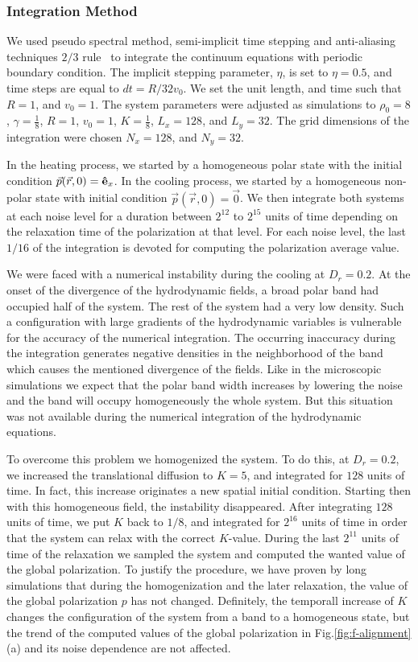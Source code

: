 \documentclass[reprint,floatfix,amsmath,amssymb,aps,pre,showkeys,showpacs,superscriptaddress]{revtex4-1}
\newcommand{\p}{p}
\begin{document}
\subsubsection{Integration Method}

We used pseudo spectral method, semi-implicit time stepping and anti-aliasing techniques $2/3$ rule~\cite{uecker2009short,canuto1993spectral} to integrate the continuum equations with periodic boundary condition. The implicit stepping parameter, $\eta$, is set to $\eta=0.5$, and time steps are equal to $dt=R/32v_0$. We set the unit length, and time such that $R=1$, and $v_0=1$. The system parameters were adjusted as simulations to $\rho_0=8$, $\gamma=\tfrac{1}{8}$, $R=1$, $v_0=1$, $K=\tfrac{1}{8}$, $L_x=128$, and $L_y=32$. The grid dimensions of the integration were chosen $N_x=128$, and $N_y=32$.

In the heating process, we started by a homogeneous polar state with the initial condition $\vec{p}(\vec{r},0) = {\bf \hat{e}}_x$. In the cooling process, we started by a homogeneous non-polar state with initial condition $\vec{p}(\vec{r},0) = \vec{0}$. We then integrate both systems at each noise level for a duration between $2^{12}$ to $2^{15}$ units of time depending on the relaxation time of the polarization at that level. For each noise level, the last $1/16$ of the integration is devoted for computing the polarization average value.

We were faced with a numerical instability during the cooling at $D_r=0.2$. At the onset of the divergence of the hydrodynamic fields, a broad polar band had occupied half of the system. The rest of the system had a very low density. Such a configuration with large gradients of the hydrodynamic variables is vulnerable for the accuracy of the numerical integration. The occurring inaccuracy during the integration generates negative densities in the neighborhood of the band which causes the mentioned divergence of the fields. Like in the microscopic simulations we expect that the polar band width increases by lowering the noise and the band will occupy homogeneously the whole system. But this situation was not available during the numerical integration of the hydrodynamic equations.

To overcome this problem we homogenized the system. To do this, at $D_r=0.2$, we increased the translational diffusion to $K=5$, and integrated for $128$ units of time. In fact, this increase originates a new spatial initial condition. Starting then with this homogeneous field, the instability
disappeared. After integrating $128$ units of time, we put $K$ back to $1/8$, and integrated for $2^{16}$ units of time in order that the system can relax with the correct $K$-value. During the last $2^{11}$ units of time of the relaxation we sampled the system and  computed the wanted value of the global polarization. To justify the procedure, we have proven by long simulations that during the homogenization and the later relaxation, the value of the global polarization $\p$ has not changed. Definitely, the temporall increase of $K$ changes the configuration of the system from a band to a homogeneous state, but the trend of  the computed values of the global polarization in Fig.\ref{fig:f-alignment}(a) and its noise dependence are not affected.
\end{document}
